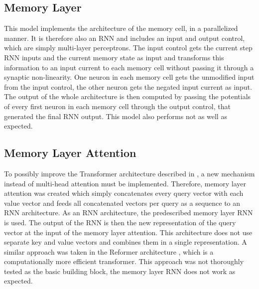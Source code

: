 \documentclass[draft,final]{vutinfth} %
\begin{document}
\subsection{Memory Layer} \label{Memory Layer}
This model implements the architecture of the memory cell, in a parallelized manner. It is therefore also an RNN and includes an input and output control, which are simply multi-layer perceptrons. 
The input control gets the current step RNN inputs and the current memory state as input and  transforms this information to an input current to each memory cell without passing it through a synaptic non-linearity.
One neuron in each memory cell gets the unmodified input from the input control, the other neuron gets the negated input current as input. 
The output of the whole architecture is then computed by passing the potentials of every first neuron in each memory cell through the output control, that generated the final RNN output.
This model also performs not as well as expected.
\subsection{Memory Layer Attention} \label{Memory Layer Attention}
To possibly improve the Transformer architecture described in \cite{Transformer}, a new mechanism instead of multi-head attention must be implemented.
Therefore, memory layer attention was created which simply concatenates every query vector with each value vector and feeds all concatenated vectors per query as a sequence to an RNN architecture.
As an RNN architecture, the predescribed memory layer RNN is used. The output of the RNN is then the new representation of the query vector at the input of the memory layer attention.
This architecture does not use separate key and value vectors and combines them in a single representation. 
A similar approach was taken in the Reformer architecture \cite{Reformer}, which is a computationally more efficient transformer.
This approach was not thoroughly tested as the basic building block, the memory layer RNN does not work as expected.
\end{document}
